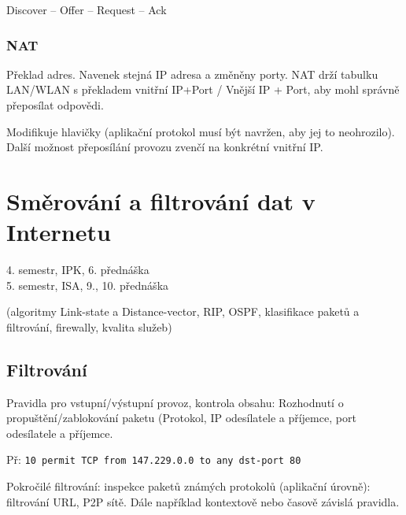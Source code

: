 \documentclass[a4paper, 11pt]{report}
\begin{document}
Discover -- Offer -- Request -- Ack

\subsection{NAT}
Překlad adres. Navenek stejná IP adresa a změněny porty. NAT drží tabulku LAN/WLAN s překladem vnitřní IP+Port / Vnější IP + Port, aby mohl správně přeposílat odpovědi.

Modifikuje hlavičky (aplikační protokol musí být navržen, aby jej to neohrozilo). Další možnost přeposílání provozu zvenčí na konkrétní vnitřní IP.

































\chapter{Směrování a filtrování dat v Internetu} \label{cha:40}

4. semestr, IPK, 6. přednáška \\
5. semestr, ISA, 9., 10. přednáška

(algoritmy Link-state a Distance-vector, RIP, OSPF, klasifikace paketů a filtrování, firewally, kvalita služeb)

\section{Filtrování}

Pravidla pro vstupní/výstupní provoz, kontrola obsahu: Rozhodnutí o propuštění/zablokování paketu (Protokol, IP odesílatele a příjemce, port odesílatele a příjemce.

Př: \verb|10 permit TCP from 147.229.0.0 to any dst-port 80|

Pokročilé filtrování: inspekce paketů známých protokolů (aplikační úrovně): filtrování URL, P2P sítě. Dále například kontextově nebo časově závislá pravidla.
\end{document}
